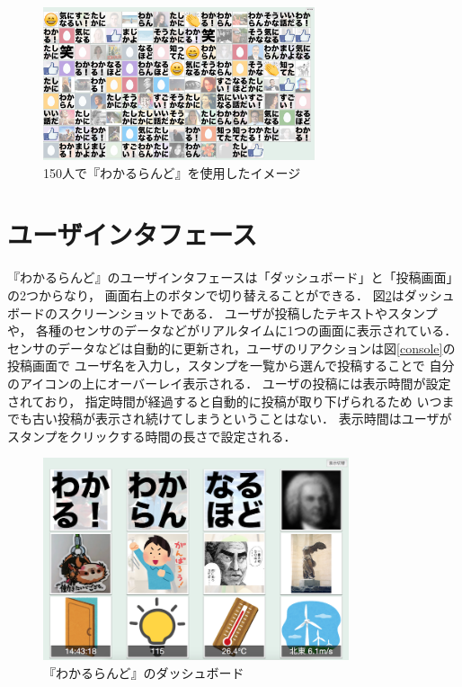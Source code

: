 
\begin{figure}[h]
\centering
\includegraphics[width=8cm]{images/wakaruland150.png}
\caption{150人で『わかるらんど』を使用したイメージ}
\label{wakaruland150}
\end{figure}

\section{ユーザインタフェース}

『わかるらんど』のユーザインタフェースは「ダッシュボード」と「投稿画面」の2つからなり，
画面右上のボタンで切り替えることができる．
図\ref{dashboard}はダッシュボードのスクリーンショットである．
ユーザが投稿したテキストやスタンプや，
各種のセンサのデータなどがリアルタイムに1つの画面に表示されている．
センサのデータなどは自動的に更新され，ユーザのリアクションは図\ref{console}の投稿画面で
ユーザ名を入力し，スタンプを一覧から選んで投稿することで
自分のアイコンの上にオーバーレイ表示される．
ユーザの投稿には表示時間が設定されており，
指定時間が経過すると自動的に投稿が取り下げられるため
いつまでも古い投稿が表示され続けてしまうということはない．
表示時間はユーザがスタンプをクリックする時間の長さで設定される．


\begin{figure}[h]
\centering
\includegraphics[width=9cm]{images/dashboard.png}
\caption{『わかるらんど』のダッシュボード}
\label{dashboard}
\end{figure}

